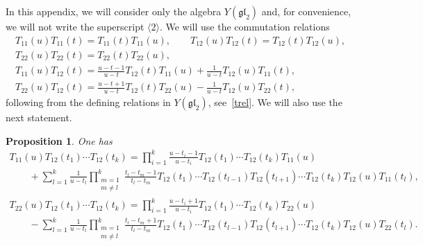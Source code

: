 \documentclass[pdftex]{sigma}
\numberwithin{equation}{section}
\newtheorem{Proposition}[Theorem]{Proposition}
 { \theoremstyle{definition}
\newtheorem{Definition}[Theorem]{Definition}
\newtheorem*{Example}{Example}
\newtheorem*{Remark}{Remark} }
\newcommand\ltwo{\langle 2\rangle}
\begin{document}
In this appendix, we will consider only the algebra $Y(\mathfrak{gl}_2)$ and, for convenience, we will not write the superscript $\ltwo$.
We will use the commutation relations
\begin{gather}
T_{11} (u)T_{11} (t)=T_{11} (t)T_{11} (u),\qquad
 T_{12} (u) T_{12} (t)= T_{12} (t) T_{12} (u),\nonumber\\
 T_{22} (u) T_{22} (t)= T_{22} (t) T_{22} (u),\label{2com1}
\\ \label{2com2}
T_{11} (u) T_{12} (t)=\frac{u-t-1}{u-t} T_{12} (t) T_{11} (u) +\frac{1}{u-t} T_{12} (u) T_{11} (t),
\\ \label{2com3}
T_{22} (u) T_{12} (t)=\frac{u-t+1}{u-t} T_{12} (t) T_{22} (u)-\frac{1}{u-t} T_{12} (u) T_{22} (t),
\end{gather}
following from the defining relations in $Y(\mathfrak{g l}_{2})$, see~\eqref{trel}. We will also use the next statement.
\begin{Proposition}
One has
\begin{gather}
T_{11} (u) T_{12} (t_1) \cdots T_{12} (t_k)=\prod_{i=1}^k\frac{u-t_i-1}{u-t_i} T_{12} (t_1)\cdots T_{12} (t_k) T_{11} (u)\label{ABf}\\[-1mm]
\qquad{}+\sum_{l=1}^k \frac{1}{u-t_l}\prod_{\substack{m=1\\m\neq l}}^k \frac{t_l-t_m-1}{t_l-t_m} T_{12} (t_1)\cdots T_{12} (t_{l-1}) T_{12} (t_{l+1})\cdots T_{12} (t_k) T_{12} (u)T_{11} (t_l),\nonumber
\\[-1mm]
T_{22} (u) T_{12} (t_1) \cdots T_{12} (t_k)=\prod_{i=1}^k\frac{u-t_i+1}{u-t_i} T_{12} (t_1)\cdots T_{12} (t_k) T_{22} (u)\label{DBf}\\[-1mm]
\qquad{} -\sum_{l=1}^k \frac{1}{u-t_l}\prod_{\substack{m=1\\m\neq l}}^k \frac{t_l-t_m+1}{t_l-t_m} T_{12} (t_1)\cdots T_{12} (t_{l-1}) T_{12} (t_{l+1})\cdots T_{12} (t_k) T_{12} (u)T_{22} (t_l).\nonumber
\end{gather}
\end{Proposition}
\end{document}
